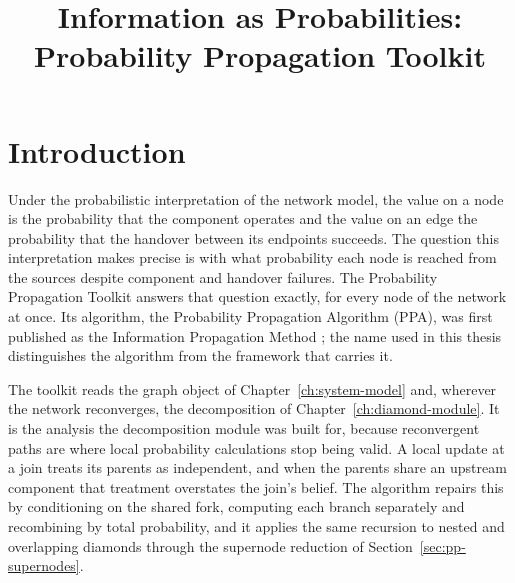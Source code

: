 \documentclass[12pt]{report}
\begin{document}
\title{Information as Probabilities: Probability Propagation Toolkit}
\fi

\providecommand{\Pa}{\mathrm{Pa}}
\providecommand{\anc}{\mathrm{anc}}
\providecommand{\infl}{\mathrm{infl}}



\section{Introduction}
\label{sec:pp-intro}

Under the probabilistic interpretation of the network model, the value on a node is the
probability that the component operates and the value on an edge the probability that the
handover between its endpoints succeeds. The question this interpretation makes precise is
with what probability each node is reached from the sources despite component and handover
failures. The Probability Propagation Toolkit answers that question exactly, for every node
of the network at once. Its algorithm, the Probability Propagation Algorithm (PPA), was first
published as the Information Propagation Method \cite{ohiani_information_2023}; the name
used in this thesis distinguishes the algorithm from the framework that carries it.

The toolkit reads the graph object of Chapter~\ref{ch:system-model} and, wherever the
network reconverges, the decomposition of Chapter~\ref{ch:diamond-module}. It is the analysis
the decomposition module was built for, because reconvergent paths are where local
probability calculations stop being valid. A local update at a join treats its parents as
independent, and when the parents share an upstream component that treatment overstates the
join's belief. The algorithm repairs this by conditioning on the shared fork, computing each
branch separately and recombining by total probability, and it applies the same recursion to
nested and overlapping diamonds through the supernode reduction of
Section~\ref{sec:pp-supernodes}.
\end{document}
